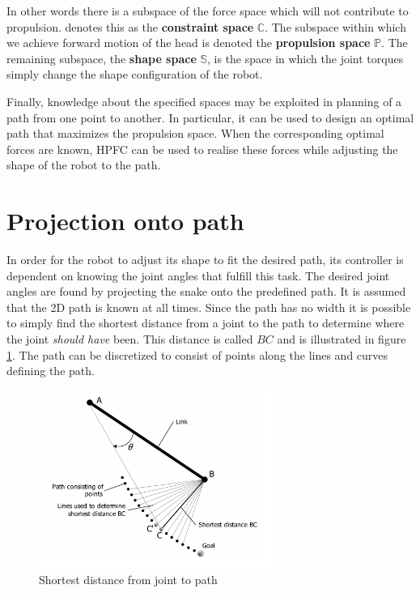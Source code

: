 In other words there is a subspace of the force space which will not contribute to propulsion. \cite{StavdahlNote} denotes this as the \textbf{constraint space} $\mathbb{C}$. The subspace within which we achieve forward motion of the head is denoted the \textbf{propulsion space} $\mathbb{P}$. The remaining subspace, the \textbf{shape space} $\mathbb{S}$, is the space in which the joint torques simply change the shape configuration of the robot.

Finally, knowledge about the specified spaces may be exploited in planning of a path from one point to another. In particular, it can be used to design an optimal path that maximizes the propulsion space. When the corresponding optimal forces are known, HPFC can be used to realise these forces while adjusting the shape of the robot to the path.


\section{Projection onto path}\label{sec:pathproj}
In order for the robot to adjust its shape to fit the desired path, its controller is dependent on knowing the joint angles that fulfill this task. The desired joint angles are found by projecting the snake onto the predefined path. It is assumed that the 2D path is known at all times. Since the path has no width it is possible to simply find the shortest distance from a joint to the path to determine where the joint \textit{should have} been. This distance is called $BC$ and is illustrated in figure \ref{fig:path_proj}. The path can be discretized to consist of points along the lines and curves defining the path.

\begin{figure}[h!]
    \centering
    \includegraphics[width=0.7\textwidth]{figures/path_proj.PNG}
    \caption{Shortest distance from joint to path \cite{conkur2008path}}
    \label{fig:path_proj}
\end{figure}

